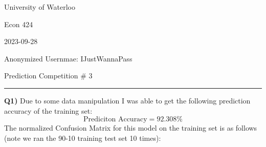 \documentclass{article}
\begin{document}
\begin{titlepage}
	\setlength{\parindent}{0pt}
	\large

\vspace*{-2cm}

University of Waterloo \par
Econ 424 \par
2023-09-28 \par
\vspace{0.05cm}
Anonymized Usernmae: IJustWannaPass
\vspace{0.2cm}

{\huge Prediction Competition \# 3 \par}
\hrule

\vspace{1cm}
\textbf{Q1)} Due to some data manipulation I was able to get the following prediction accuracy of the training set:
\[ \text{Prediciton Accuracy} =  92.308\% \]
The normalized Confusion Matrix for this model on the training set is as follows (note we ran the 90-10 training test set 10 times):


\end{titlepage}
\end{document}
